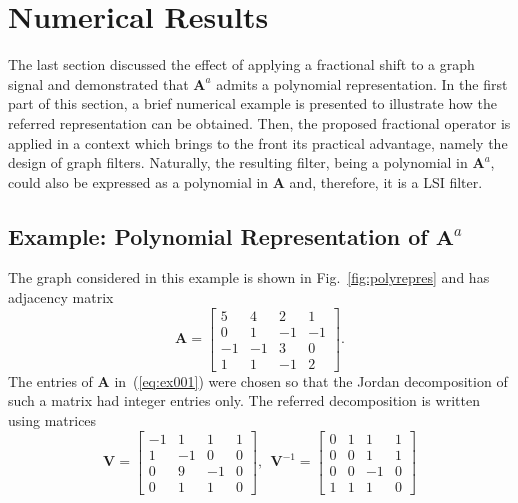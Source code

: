 \section{Numerical Results}\label{sec:num}
The last section discussed the effect of applying a fractional shift to a graph signal and demonstrated that $\mathbf{A}^a$ admits a polynomial representation. In the first part of this section, a brief numerical example is presented to illustrate how the referred representation can be obtained. Then, the proposed fractional operator is applied in a context which brings to the front its practical advantage, namely the design of graph filters. Naturally, the resulting filter, being a polynomial in $\mathbf{A}^a$, could also be expressed as a polynomial in $\mathbf{A}$ and, therefore, it is a LSI filter.

\subsection{Example: Polynomial Representation of $\mathbf{A}^{a}$}\label{subsec:num1}
The graph considered in this example is shown in Fig.~\ref{fig:polyrepres} and has adjacency matrix
\begin{equation}\label{eq:ex001}
    \mathbf{A}=\left[\begin{array}{ccccc}
            5  & 4  & 2  & 1  \\
            0  & 1  & -1 & -1 \\
            -1 & -1 & 3  & 0  \\
            1  & 1  & -1 & 2
        \end{array}\right].
\end{equation}
The entries of $\mathbf{A}$ in~(\ref{eq:ex001}) were chosen so that the Jordan decomposition of such a matrix had integer entries only. The referred decomposition is written using matrices
\begin{equation}\nonumber
    \mathbf{V}=\left[\begin{array}{ccccc}
            -1 & 1  & 1  & 1 \\
            1  & -1 & 0  & 0 \\
            0  & 9  & -1 & 0 \\
            0  & 1  & 1  & 0
        \end{array}\right],\:\:
    \mathbf{V}^{-1}=\left[\begin{array}{ccccc}
            0 & 1 & 1  & 1 \\
            0 & 0 & 1  & 1 \\
            0 & 0 & -1 & 0 \\
            1 & 1 & 1  & 0
        \end{array}\right]
\end{equation}
